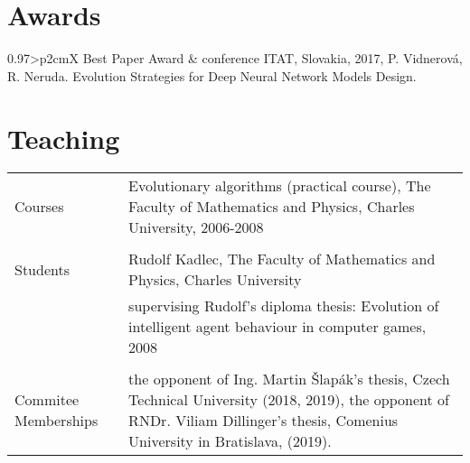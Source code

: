 \documentclass[a4paper, oneside, final]{scrartcl} %
\newcommand{\gray}{\rowcolor[gray]{.90}} %
\begin{document}

\section{Awards}
\begin{tabularx}{0.97\linewidth}{>{\raggedleft}p{2cm}X}
  Best Paper Award & conference ITAT, Slovakia, 2017, P. Vidnerov\'a, R. Neruda. Evolution Strategies for Deep Neural Network Models Design. \\ 
\end{tabularx}

\section{Teaching}
\begin{tabularx}{0.97\linewidth}{>{\raggedleft}p{2cm}X}
\gray Courses &   Evolutionary algorithms (practical course), The Faculty of Mathematics and Physics, Charles University,
2006-2008 \\
\\
\gray Students & Rudolf Kadlec, The Faculty of Mathematics and Physics, Charles University \\
&  supervising Rudolf's diploma thesis: Evolution of intelligent agent behaviour in computer games,
    2008 \\
\\
\gray Commitee Memberships & 
    the opponent of Ing. Martin \v{S}lap\'ak's thesis,
    Czech Technical University (2018, 2019),
     the opponent of RNDr. Viliam Dillinger's thesis, Comenius University in Bratislava, (2019). \\
\end{tabularx}

\end{document}
